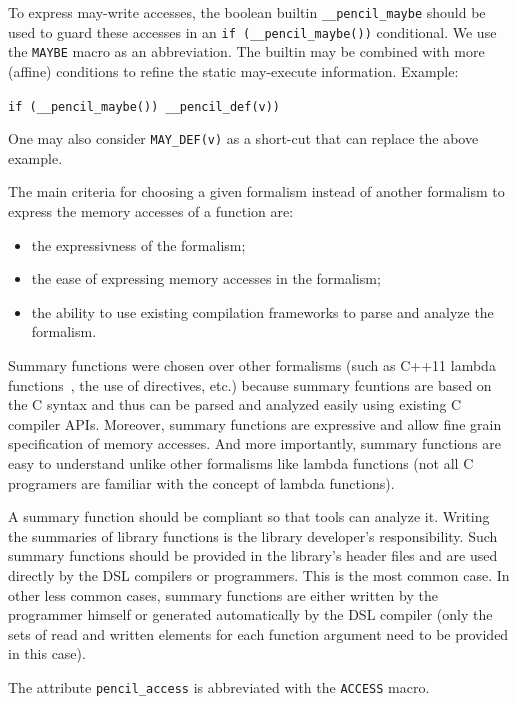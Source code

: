   To express may-write accesses, the boolean builtin
  \lstinline!__pencil_maybe! should be used to guard these accesses
  in an \lstinline!if (__pencil_maybe())!  conditional. We use the
  \lstinline!MAYBE! macro as an abbreviation. The
  builtin may be combined with more (affine) conditions to refine
  the static may-execute information. Example:

  \lstinline!if (__pencil_maybe()) __pencil_def(v))!

  One may also consider \lstinline!MAY_DEF(v)! as a short-cut that
  can replace the above example.

  The main criteria for choosing a given formalism instead of another
  formalism to express the memory accesses of a function are:
  \begin{itemize}
   \item the expressivness of the formalism;
   \item the ease of expressing memory accesses in the formalism;
   \item the ability to use existing compilation frameworks to parse
         and analyze the formalism.
  \end{itemize}

  Summary functions were chosen over other formalisms (such as C++11 lambda
  functions~\cite{cpp11}, the use of directives, etc.) because summary
  fcuntions are based on the C syntax and thus can be parsed and analyzed
  easily using existing C compiler APIs.
  Moreover, summary functions are expressive and allow fine grain
  specification of memory accesses.
  And more importantly, summary functions are easy to understand unlike other
  formalisms like lambda functions (not all C programers are familiar with
  the concept of lambda functions).
  
  A summary function should be \pencil compliant so that \pencil tools can
  analyze it.
  Writing the summaries of library functions is the library developer's 
  responsibility.
  Such summary functions should be provided in the library's header
  files and are used directly by the DSL compilers or \pencil programmers.
  This is the most common case.
  In other less common cases, summary functions are either written by the
  \pencil programmer himself or generated automatically by the DSL compiler
  (only the sets of read and written elements for each function argument need to 
  be provided in this case).
  
  The attribute \lstinline!pencil_access! is
  abbreviated with the \lstinline!ACCESS! macro.

